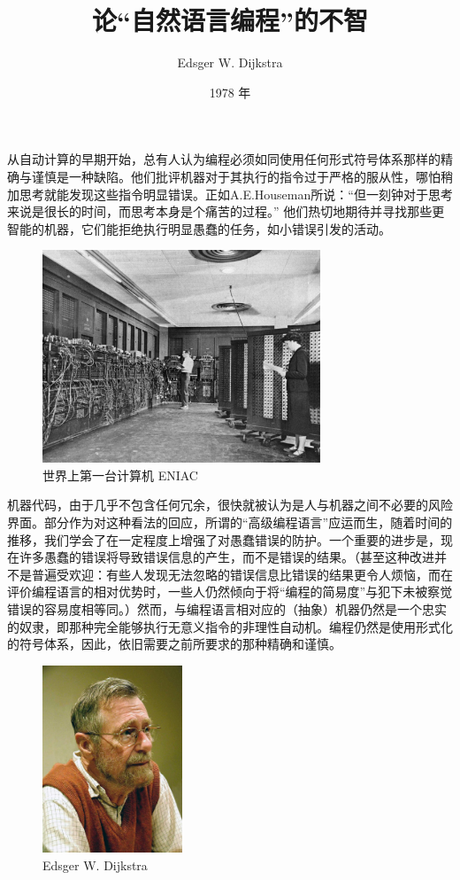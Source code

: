 \documentclass[a4paper,12pt]{article}
\title{论“自然语言编程”的不智}
\date{1978 年}
\author{Edsger W. Dijkstra}
\begin{document}
\maketitle{}

从自动计算的早期开始，总有人认为编程必须如同使用任何形式符号体系那样的精确与谨慎是一种缺陷。他们批评机器对于其执行的指令过于严格的服从性，哪怕稍加思考就能发现这些指令明显错误。正如A.E.Houseman所说：“但一刻钟对于思考来说是很长的时间，而思考本身是个痛苦的过程。” 他们热切地期待并寻找那些更智能的机器，它们能拒绝执行明显愚蠢的任务，如小错误引发的活动。

\begin{figure}[ht]
    \centering
    \includegraphics[height=2.5in]{images/ENIAC.jpeg}
    \caption{世界上第一台计算机 ENIAC}
\end{figure}

机器代码，由于几乎不包含任何冗余，很快就被认为是人与机器之间不必要的风险界面。部分作为对这种看法的回应，所谓的“高级编程语言”应运而生，随着时间的推移，我们学会了在一定程度上增强了对愚蠢错误的防护。一个重要的进步是，现在许多愚蠢的错误将导致错误信息的产生，而不是错误的结果。（甚至这种改进并不是普遍受欢迎：有些人发现无法忽略的错误信息比错误的结果更令人烦恼，而在评价编程语言的相对优势时，一些人仍然倾向于将“编程的简易度”与犯下未被察觉错误的容易度相等同。）然而，与编程语言相对应的（抽象）机器仍然是一个忠实的奴隶，即那种完全能够执行无意义指令的非理性自动机。编程仍然是使用形式化的符号体系，因此，依旧需要之前所要求的那种精确和谨慎。

\begin{figure}
    \centering
    \includegraphics[height=2.2in]{images/Edsger_Wybe_Dijkstra.jpeg}
    \caption{Edsger W. Dijkstra}
\end{figure}
\end{document}
